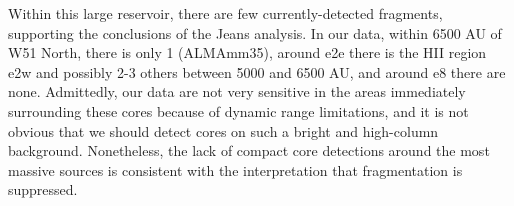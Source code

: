 \documentclass{emulateapj}
\begin{document}




Within this large reservoir, there are few currently-detected fragments,
supporting the conclusions of the Jeans analysis.
In our data, within 6500 AU of W51 North, there is only 1 (ALMAmm35), around
e2e there is the HII region e2w and possibly 2-3 others between 5000 and 6500
AU, and around e8 there are none.  Admittedly, our data are not very sensitive
in the areas immediately surrounding these cores because of dynamic
range limitations, and it is not obvious that we should detect cores on such
a bright and high-column background.  Nonetheless, the lack of compact core
detections around the most massive sources is consistent with the interpretation
that fragmentation is suppressed.

\end{document}
